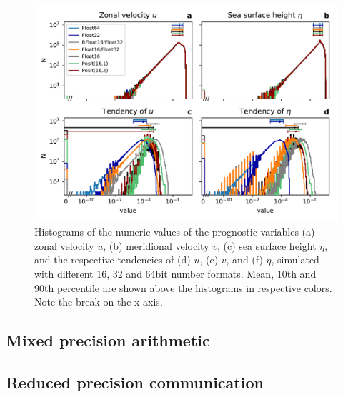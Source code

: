 \documentclass[draft]{agujournal2019}
\begin{document}

\begin{figure}
\includegraphics[width=1\textwidth]{../plots/tendency_hist.pdf}
\caption{Histograms of the numeric values of the prognostic variables (a) zonal velocity $u$, (b) meridional velocity $v$, (c) sea surface height $\eta$, and the respective tendencies of (d) $u$, (e) $v$, and (f) $\eta$, simulated with different 16, 32 and 64bit number formats. Mean, 10th and 90th percentile are shown above the histograms in respective colors. Note the break on the x-axis.}
\label{fig:tend}
\end{figure}

\subsection{Mixed precision arithmetic}
\label{sec:mixed}


\subsection{Reduced precision communication}
\label{sec:comm}
\end{document}
